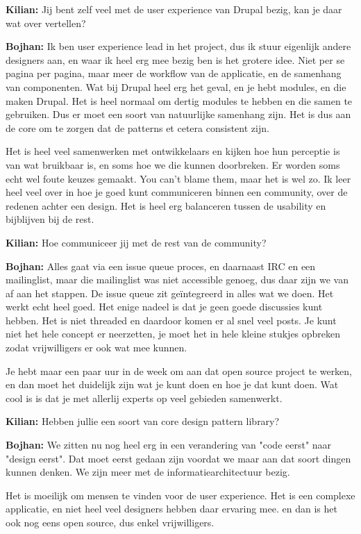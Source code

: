 \textbf{Kilian:} Jij bent zelf veel met de user experience van Drupal bezig, kan je daar wat over vertellen?

\textbf{Bojhan:} Ik ben user experience lead in het project, dus ik stuur eigenlijk andere designers aan, en waar ik heel erg mee bezig ben is het grotere idee. Niet per se pagina per pagina, maar meer de workflow van de applicatie, en de samenhang van componenten. Wat bij Drupal heel erg het geval, en je hebt modules, en die maken Drupal. Het is heel normaal om dertig modules te hebben en die samen te gebruiken. Dus er moet een soort van natuurlijke samenhang zijn. Het is dus aan de core om te zorgen dat de patterns et cetera consistent zijn.

Het is heel veel samenwerken met ontwikkelaars en kijken hoe hun perceptie is van wat bruikbaar is, en soms hoe we die kunnen doorbreken. Er worden soms echt wel foute keuzes gemaakt. You can't blame them, maar het is wel zo. Ik leer heel veel over in hoe je goed kunt communiceren binnen een community, over de redenen achter een design. Het is heel erg balanceren tussen de usability en bijblijven bij de rest.

\textbf{Kilian:} Hoe communiceer jij met de rest van de community?

\textbf{Bojhan:} Alles gaat via een issue queue proces, en daarnaast IRC en een mailinglist, maar die mailinglist was niet accessible genoeg, dus daar zijn we van af aan het stappen. De issue queue zit ge\"integreerd in alles wat we doen. Het werkt echt heel goed. Het enige nadeel is dat je geen goede discussies kunt hebben. Het is niet threaded en daardoor komen er al snel veel posts. Je kunt niet het hele concept er neerzetten, je moet het in hele kleine stukjes opbreken zodat vrijwilligers er ook wat mee kunnen.

Je hebt maar een paar uur in de week om aan dat open source project te werken, en dan moet het duidelijk zijn wat je kunt doen en hoe je dat kunt doen. Wat cool is is dat je met allerlij experts op veel gebieden samenwerkt.

\textbf{Kilian:} Hebben jullie een soort van core design pattern library?

\textbf{Bojhan:} We zitten nu nog heel erg in een verandering van "code eerst" naar "design eerst". Dat moet eerst gedaan zijn voordat we maar aan dat soort dingen kunnen denken. We zijn meer met de informatiearchitectuur bezig.

Het is moeilijk om mensen te vinden voor de user experience. Het is een complexe applicatie, en niet heel veel designers hebben daar ervaring mee. en dan is het ook nog eens open source, dus enkel vrijwilligers.

